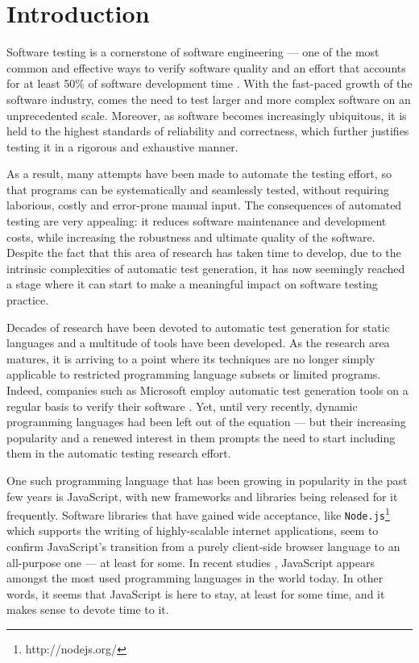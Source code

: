 \documentclass[a4paper,11pt,titlepage]{report}
\begin{document}
\tableofcontents

\chapter{Introduction}



Software testing is a cornerstone of software engineering --- one of the most common and effective ways to verify software quality and an effort that accounts for at least 50\% of software development time \cite{tahbildar2automated}. With the fast-paced growth of the software industry, comes the need to test larger and more complex software on an unprecedented scale. Moreover, as software becomes increasingly ubiquitous, it is held to the highest standards of reliability and correctness, which further justifies testing it in a rigorous and exhaustive manner.

As a result, many attempts have been made to automate the testing effort, so that programs can be systematically and seamlessly tested, without requiring laborious, costly and error-prone manual input. The consequences of automated testing are very appealing: it reduces software maintenance and development costs, while increasing the robustness and ultimate quality of the software. Despite the fact that this area of research has taken time to develop, due to the intrinsic complexities of automatic test generation, it has now seemingly reached a stage where it can start to make a meaningful impact on software testing practice.

Decades of research have been devoted to automatic test generation for static languages and a multitude of tools have been developed. As the research area matures, it is arriving to a point where its techniques are no longer simply applicable to restricted programming language subsets or limited programs. Indeed, companies such as Microsoft employ automatic test generation tools on a regular basis to verify their software \cite{păsăreanu2009survey}. Yet, until very recently, dynamic programming languages had been left out of the equation --- but their increasing popularity and a renewed interest in them prompts the need to start including them in the automatic testing research effort.

One such programming language that has been growing in popularity in the past few years is JavaScript, with new frameworks and libraries being released for it frequently. Software libraries that have gained wide acceptance, like \texttt{Node.js}\footnote{http://nodejs.org/} which supports the writing of highly-scalable internet applications, seem to confirm JavaScript's transition from a purely client-side browser language to an all-purpose one --- at least for some. In recent studies \cite{website:langpop}, JavaScript appears amongst the most used programming languages in the world today. In other words, it seems that JavaScript is here to stay, at least for some time, and it makes sense to devote time to it.
\end{document}
